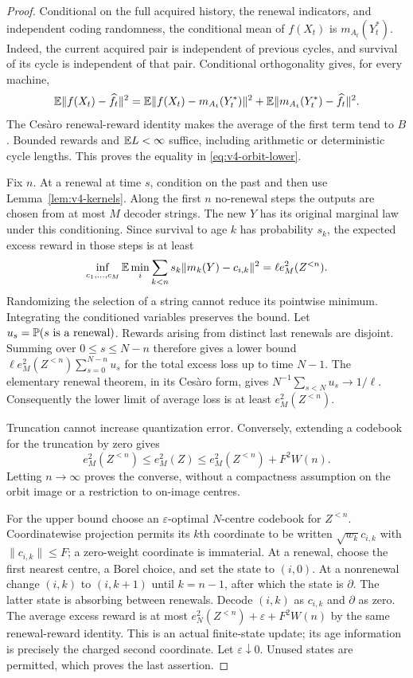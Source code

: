\begin{proof}
Conditional on the full acquired history, the renewal indicators, and
independent coding randomness, the conditional mean of $f(X_t)$ is
$m_{A_t}(Y_t^*)$. Indeed, the current acquired pair is independent of
previous cycles, and survival of its cycle is independent of that
pair. Conditional orthogonality gives, for every machine,
\[
 \mathbb E\|f(X_t)-\widehat f_t\|^2
 =\mathbb E\|f(X_t)-m_{A_t}(Y_t^*)\|^2
  +\mathbb E\|m_{A_t}(Y_t^*)-\widehat f_t\|^2.
\]
The Ces\`aro renewal-reward identity makes the average of the first
term tend to $B$. Bounded rewards and $\mathbb E L<\infty$ suffice, including
arithmetic or deterministic cycle lengths. This proves the equality
in \eqref{eq:v4-orbit-lower}.

Fix $n$. At a renewal at time $s$, condition on the past and then use
Lemma~\ref{lem:v4-kernels}. Along the first $n$ no-renewal steps the
outputs are chosen from at most $M$ decoder strings. The new $Y$ has
its original marginal law under this conditioning. Since survival to
age $k$ has probability $s_k$, the expected excess reward in those
steps is at least
\[
 \inf_{c_1,\ldots,c_M}\mathbb E\min_i
       \sum_{k<n}s_k\|m_k(Y)-c_{i,k}\|^2
 =\ell e_M^2(Z^{<n}).
\]
Randomizing the selection of a string cannot reduce its pointwise
minimum. Integrating the conditioned variables preserves the bound.
Let $u_s=\mathbb P(s\text{ is a renewal})$. Rewards arising from distinct
last renewals are disjoint. Summing over $0\le s\le N-n$ therefore
gives a lower bound
$\ell e_M^2(Z^{<n})\sum_{s=0}^{N-n}u_s$ for the total excess loss up
to time $N-1$. The elementary renewal theorem, in its Ces\`aro form,
gives $N^{-1}\sum_{s<N}u_s\to1/\ell$. Consequently the lower limit
of average loss is at least $e_M^2(Z^{<n})$.

Truncation cannot increase quantization error. Conversely, extending
a codebook for the truncation by zero gives
\[
 e_M^2(Z^{<n})\le e_M^2(Z)
 \le e_M^2(Z^{<n})+F^2W(n).
\]
Letting $n\to\infty$ proves the converse, without a compactness
assumption on the orbit image or a restriction to on-image centres.

For the upper bound choose an $\varepsilon$-optimal $N$-centre
codebook for $Z^{<n}$. Coordinatewise projection permits its $k$th
coordinate to be written $\sqrt{w_k}c_{i,k}$ with $\|c_{i,k}\|\le F$;
a zero-weight coordinate is immaterial. At a renewal, choose the first
nearest centre, a Borel choice, and set the state to $(i,0)$.
At a nonrenewal change $(i,k)$ to $(i,k+1)$ until $k=n-1$, after
which the state is $\partial$. The latter state is absorbing between
renewals. Decode $(i,k)$ as $c_{i,k}$ and $\partial$ as zero.
The average excess reward is at most
$e_N^2(Z^{<n})+\varepsilon+F^2W(n)$ by the same renewal-reward
identity. This is an actual finite-state update; its age information
is precisely the charged second coordinate. Let $\varepsilon\downarrow0$.
Unused states are permitted, which proves the last assertion.
\end{proof}

